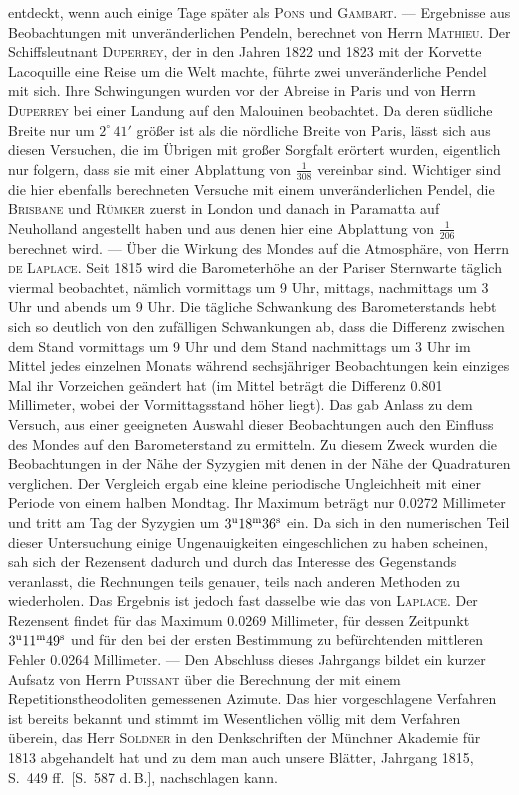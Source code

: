 entdeckt, wenn auch einige Tage später als \textsc{Pons} und \textsc{Gambart}. --- Ergebnisse aus Beobachtungen mit unveränderlichen Pendeln, berechnet von Herrn \textsc{Mathieu}. Der Schiffsleutnant \textsc{Duperrey}, der in den Jahren 1822 und 1823 mit der Korvette Lacoquille eine Reise um die Welt machte, führte zwei unveränderliche Pendel mit sich. Ihre Schwingungen wurden vor der Abreise in Paris und von Herrn \textsc{Duperrey} bei einer Landung auf den Malouinen beobachtet. Da deren südliche Breite nur um $2^\circ\,41'$ größer ist als die nördliche Breite von Paris, lässt sich aus diesen Versuchen, die im Übrigen mit großer Sorgfalt erörtert wurden, eigentlich nur folgern, dass sie mit einer Abplattung von $\frac{1}{308}$ vereinbar sind. Wichtiger sind die hier ebenfalls berechneten Versuche mit einem unveränderlichen Pendel, die \textsc{Brisbane} und \textsc{Rümker} zuerst in London und danach in Paramatta auf Neuholland angestellt haben und aus denen hier eine Abplattung von $\frac{1}{206}$ berechnet wird. --- Über die Wirkung des Mondes auf die Atmosphäre, von Herrn \textsc{de Laplace}. Seit 1815 wird die Barometerhöhe an der Pariser Sternwarte täglich viermal beobachtet, nämlich vormittags um 9 Uhr, mittags, nachmittags um 3 Uhr und abends um 9 Uhr. Die tägliche Schwankung des Barometerstands hebt sich so deutlich von den zufälligen Schwankungen ab, dass die Differenz zwischen dem Stand vormittags um 9 Uhr und dem Stand nachmittags um 3 Uhr im Mittel jedes einzelnen Monats während sechsjähriger Beobachtungen kein einziges Mal ihr Vorzeichen geändert hat (im Mittel beträgt die Differenz 0.801 Millimeter, wobei der Vormittagsstand höher liegt). Das gab Anlass zu dem Versuch, aus einer geeigneten Auswahl dieser Beobachtungen auch den Einfluss des Mondes auf den Barometerstand zu ermitteln. Zu diesem Zweck wurden die Beobachtungen in der Nähe der Syzygien mit denen in der Nähe der Quadraturen verglichen. Der Vergleich ergab eine kleine periodische Ungleichheit mit einer Periode von einem halben Mondtag. Ihr Maximum beträgt nur 0.0272 Millimeter und tritt am Tag der Syzygien um $3^{\rm u}18^{\rm m}36^{\rm s}$ ein. Da sich in den numerischen Teil dieser Untersuchung einige Ungenauigkeiten eingeschlichen zu haben scheinen, sah sich der Rezensent dadurch und durch das Interesse des Gegenstands veranlasst, die Rechnungen teils genauer, teils nach anderen Methoden zu wiederholen. Das Ergebnis ist jedoch fast dasselbe wie das von \textsc{Laplace}. Der Rezensent findet für das Maximum 0.0269 Millimeter, für dessen Zeitpunkt $3^{\rm u}11^{\rm m}49^{\rm s}$ und für den bei der ersten Bestimmung zu befürchtenden mittleren Fehler 0.0264 Millimeter. --- Den Abschluss dieses Jahrgangs bildet ein kurzer Aufsatz von Herrn \textsc{Puissant} über die Berechnung der mit einem Repetitionstheodoliten gemessenen Azimute. Das hier vorgeschlagene Verfahren ist bereits bekannt und stimmt im Wesentlichen völlig mit dem Verfahren überein, das Herr \textsc{Soldner} in den Denkschriften der Münchner Akademie für 1813 abgehandelt hat und zu dem man auch unsere Blätter, Jahrgang 1815, S.\ 449 ff.\ [S.\ 587 d.\,B.], nachschlagen kann.
